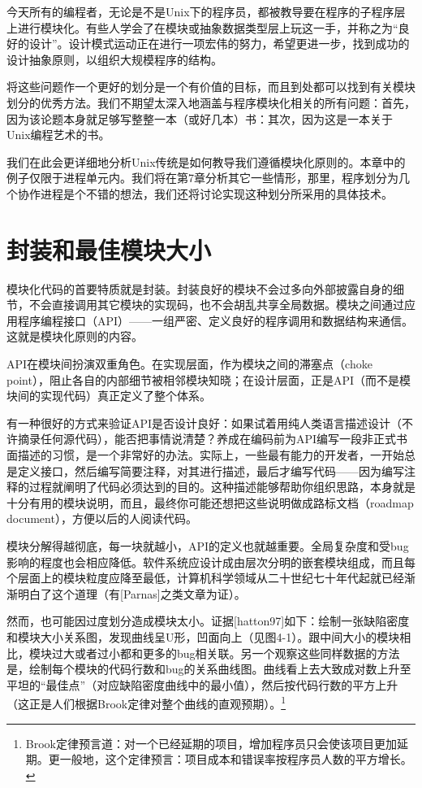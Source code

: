 \documentclass[11pt,oneside]{book}
\begin{document}
\begin{common-format}
今天所有的编程者，无论是不是Unix下的程序员，都被教导要在程序的子程序层上进行模块化。有些人学会了在模块或抽象数据类型层上玩这一手，并称之为“良好的设计”。设计模式运动正在进行一项宏伟的努力，希望更进一步，找到成功的设计抽象原则，以组织大规模程序的结构。

将这些问题作一个更好的划分是一个有价值的目标，而且到处都可以找到有关模块划分的优秀方法。我们不期望太深入地涵盖与程序模块化相关的所有问题：首先，因为该论题本身就足够写整整一本（或好几本）书：其次，因为这是一本关于Unix编程艺术的书。

我们在此会更详细地分析Unix传统是如何教导我们遵循模块化原则的。本章中的例子仅限于进程单元内。我们将在第7章分析其它一些情形，那里，程序划分为几个协作进程是个不错的想法，我们还将讨论实现这种划分所采用的具体技术。


\section{封装和最佳模块大小}
模块化代码的首要特质就是封装。封装良好的模块不会过多向外部披露自身的细节，不会直接调用其它模块的实现码，也不会胡乱共享全局数据。模块之间通过应用程序编程接口（API）——一组严密、定义良好的程序调用和数据结构来通信。这就是模块化原则的内容。

API在模块间扮演双重角色。在实现层面，作为模块之间的滞塞点（choke point），阻止各自的内部细节被相邻模块知晓；在设计层面，正是API（而不是模块间的实现代码）真正定义了整个体系。

有一种很好的方式来验证API是否设计良好：如果试着用纯人类语言描述设计（不许摘录任何源代码），能否把事情说清楚？养成在编码前为API编写一段非正式书面描述的习惯，是一个非常好的办法。实际上，一些最有能力的开发者，一开始总是定义接口，然后编写简要注释，对其进行描述，最后才编写代码——因为编写注释的过程就阐明了代码必须达到的目的。这种描述能够帮助你组织思路，本身就是十分有用的模块说明，而且，最终你可能还想把这些说明做成路标文档（roadmap document），方便以后的人阅读代码。

模块分解得越彻底，每一块就越小，API的定义也就越重要。全局复杂度和受bug影响的程度也会相应降低。软件系统应设计成由层次分明的嵌套模块组成，而且每个层面上的模块粒度应降至最低，计算机科学领域从二十世纪七十年代起就已经渐渐明白了这个道理（有[Parnas]之类文章为证）。

然而，也可能因过度划分造成模块太小。证据[hatton97]如下：绘制一张缺陷密度和模块大小关系图，发现曲线呈U形，凹面向上（见图4-1）。跟中间大小的模块相比，模块过大或者过小都和更多的bug相关联。另一个观察这些同样数据的方法是，绘制每个模块的代码行数和bug的关系曲线图。曲线看上去大致成对数上升至平坦的“最佳点”（对应缺陷密度曲线中的最小值），然后按代码行数的平方上升（这正是人们根据Brook定律对整个曲线的直观预期）。\footnote{ Brook定律预言道：对一个已经延期的项目，增加程序员只会使该项目更加延期。更一般地，这个定律预言：项目成本和错误率按程序员人数的平方增长。}


\end{common-format}
\end{document}
